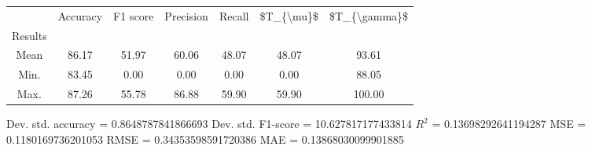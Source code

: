 \begin{tabular}{|c|c|c|c|c|c|c|}
\toprule
{} &  Accuracy &  F1 score &  Precision &  Recall &  \$T\_\{\textbackslash mu\}\$ &  \$T\_\{\textbackslash gamma\}\$ \\
Results &           &           &            &         &            &               \\
\hline
Mean    &     86.17 &     51.97 &      60.06 &   48.07 &      48.07 &         93.61 \\
Min.    &     83.45 &      0.00 &       0.00 &    0.00 &       0.00 &         88.05 \\
Max.    &     87.26 &     55.78 &      86.88 &   59.90 &      59.90 &        100.00 \\
\bottomrule
\end{tabular}

 Dev. std. accuracy = 0.8648787841866693
 Dev. std. F1-score = 10.627817177433814
 $R^2$ = 0.13698292641194287
 MSE = 0.1180169736201053
 RMSE = 0.34353598591720386
 MAE = 0.13868030099901885
